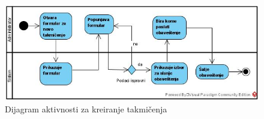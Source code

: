 \documentclass[../../main.tex]{subfiles}
\begin{document}
\begin{figure}[!ht]
\begin{center}
\includegraphics[scale=0.55]{sections/images/dijagram_atkivnovnosti_kreiranje_takmicenja.jpg}
\end{center}
\caption{Dijagram aktivnosti za kreiranje takmičenja}
\label{fig:kontekst}
\end{figure}
\end{document}
